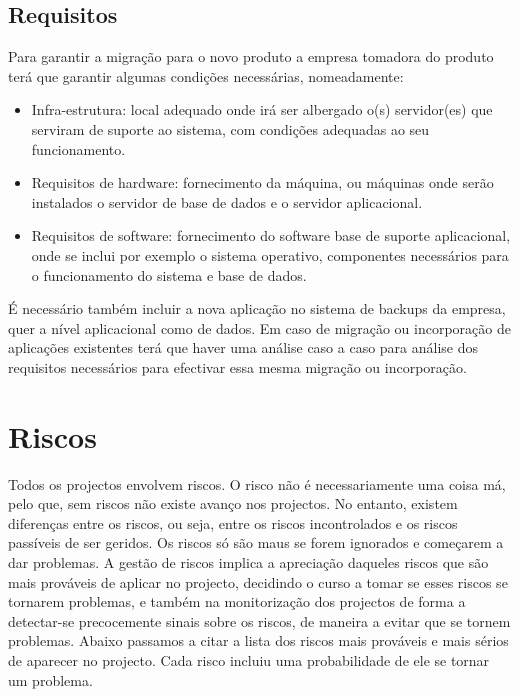 \subsection{Requisitos}
Para garantir a migração para o novo produto a empresa tomadora do produto terá que garantir algumas condições necessárias, nomeadamente:

\begin{itemize} 
\item Infra-estrutura: local adequado onde irá ser albergado o(s) servidor(es) que serviram de suporte ao sistema, com condições adequadas ao seu funcionamento.
\item Requisitos de hardware: fornecimento da máquina, ou máquinas onde serão instalados o servidor de base de dados e o servidor aplicacional.
\item Requisitos de software: fornecimento do software base de suporte aplicacional, onde se inclui por exemplo o sistema operativo, componentes necessários para o funcionamento do sistema e base de dados.
\end{itemize}

É necessário também incluir a nova aplicação no sistema de backups da empresa, quer a nível aplicacional como de dados.
Em caso de migração ou incorporação de aplicações existentes terá que haver uma análise caso a caso para análise dos requisitos necessários para efectivar essa mesma migração ou incorporação.
 
\section{Riscos}
Todos os projectos envolvem riscos. O risco não é necessariamente uma coisa má, pelo que, sem riscos não existe avanço nos projectos. No entanto, existem diferenças entre os riscos, ou seja, entre os riscos incontrolados e os riscos passíveis de ser geridos. Os riscos só são maus se forem ignorados e começarem a dar problemas.
A gestão de riscos implica a apreciação daqueles riscos que são mais prováveis de aplicar no projecto, decidindo o curso a tomar se esses riscos se tornarem problemas, e também na monitorização dos projectos de forma a detectar-se precocemente sinais sobre os riscos, de maneira a evitar que se tornem problemas.
Abaixo passamos a citar a lista dos riscos mais prováveis e mais sérios de aparecer no projecto. Cada risco incluiu uma probabilidade de ele se tornar um problema.

